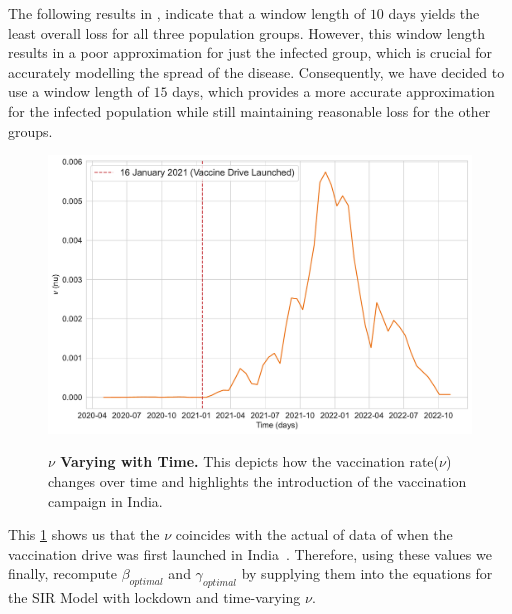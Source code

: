 \documentclass[tikz,fleqn,12pt]{wlscirep}
\begin{document}
The following results in , indicate that a window length of $10$ days yields the least overall loss for all three population groups. However, this window length results in a poor approximation for just the infected group, which is crucial for accurately modelling the spread of the disease. Consequently, we have decided to use a window length of $15$ days, which provides a more accurate approximation for the infected population while still maintaining reasonable loss for the other groups.

\begin{figure}[htbp!]
  \centering
  \includegraphics[width=\linewidth]{images/interpolated_nu_varying_with_time_IND.pdf}
  \label{fig:interpolated_nu_varying_with_time_IND}
  \caption{\textbf{$\nu$ Varying with Time.} This depicts how the vaccination rate($\nu$) changes over time and highlights the introduction of the vaccination campaign in India.}
\end{figure}

This \cref{fig:interpolated_nu_varying_with_time_IND} shows us that the $\nu$ coincides with the actual of data of when the vaccination drive was first launched in India~\cite{UnicefCovidVaccine,PIBCovidVaccine,WikipediaCovidVaccine}. Therefore, using these values we finally, recompute $\beta_{optimal}$ and $\gamma_{optimal}$ by supplying them into the equations for the SIR Model with lockdown and time-varying $\nu$.
\end{document}
